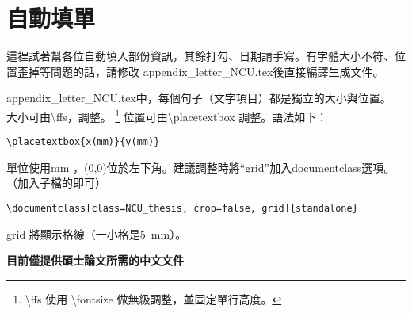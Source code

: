 \documentclass[class=NCU_thesis, crop=false]{standalone}
\begin{document}
\chapter{自動填單}
這裡試著幫各位自動填入部份資訊，其餘打勾、日期請手寫。有字體大小不符、位置歪掉等問題的話，請修改 appendix\_letter\_NCU.tex後直接編譯生成文件。

appendix\_letter\_NCU.tex中，每個句子（文字項目）都是獨立的大小與位置。 大小可由\textbackslash{}ffs，調整。
\footnote{\textbackslash{}ffs 使用 \textbackslash{}fontsize 做無級調整，並固定單行高度。 }
位置可由\textbackslash{}placetextbox 調整。語法如下：
\begin{lstlisting}[style=LatexStyle,caption={}]
\placetextbox{x(mm)}{y(mm)}
\end{lstlisting}
單位使用mm ，(0,0)位於左下角。建議調整時將``grid''加入documentclass選項。（加入子檔的即可）
\begin{lstlisting}[style=LatexStyle,caption={}]
\documentclass[class=NCU_thesis, crop=false, grid]{standalone}
\end{lstlisting}
grid 將顯示格線（一小格是\SI{5}{\milli\metre}）。

\begin{center}
{ \noindent\color{red}\bfseries\Large 目前僅提供碩士論文所需的中文文件}
\end{center}

\cleardoublepage
\pagestyle{empty}
\sffamily





\pagestyle{fancy}
\end{document}
